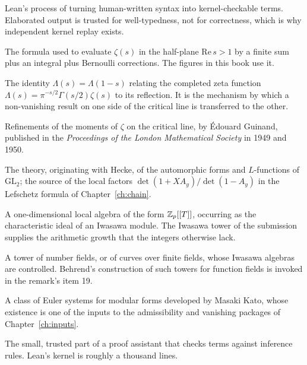 \begin{description}[style=nextline,leftmargin=0pt,labelwidth=0pt,labelsep=0pt,font=\sffamily\bfseries\small,
  itemsep=5pt]
\item[Elaboration] Lean's process of turning human-written syntax into
kernel-checkable terms. Elaborated output is trusted for well-typedness, not
for correctness, which is why independent kernel replay exists.

\item[Euler--Maclaurin summation] The formula used to evaluate $\zeta(s)$ in
the half-plane $\mathrm{Re}\,  s > 1$ by a finite sum plus an integral plus Bernoulli
corrections. The figures in this book use it.

\item[Functional equation] The identity $\Lambda(s) = \Lambda(1-s)$ relating
the completed zeta function $\Lambda(s) = \pi^{-s/2}\Gamma(s/2)\zeta(s)$ to
its reflection. It is the mechanism by which a non-vanishing result on one
side of the critical line is transferred to the other.

\item[Guinand's theorem] Refinements of the moments of $\zeta$ on the critical
line, by Édouard Guinand, published in the \emph{Proceedings of the London
Mathematical Society} in 1949 and 1950.

\item[Harmonic analysis on $\mathrm{GL}_2$] The theory, originating with
Hecke, of the automorphic forms and $L$-functions of $\mathrm{GL}_2$; the
source of the local factors $\det(1 + XA_y)/\det(1 - A_y)$ in the Lefschetz
formula of Chapter~\ref{ch:chain}.

\item[Iwasawa algebra] A one-dimensional local algebra of the form
$\mathbb{Z}_p[[T]]$, occurring as the characteristic ideal of an Iwasawa module. The
Iwasawa tower of the submission supplies the arithmetic growth that the
integers otherwise lack.

\item[Iwasawa tower] A tower of number fields, or of curves over finite
fields, whose Iwasawa algebras are controlled. Behrend's construction of
such towers for function fields is invoked in the remark's item 19.

\item[Kato's Euler system] A class of Euler systems for modular forms
developed by Masaki Kato, whose existence is one of the inputs to the
admissibility and vanishing packages of Chapter~\ref{ch:inputs}.

\item[Kernel] The small, trusted part of a proof assistant that checks terms
against inference rules. Lean's kernel is roughly a thousand lines.


\end{description}
